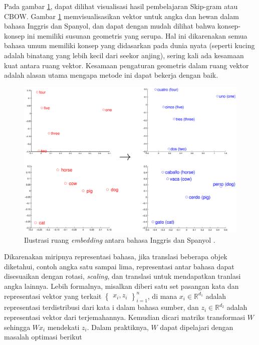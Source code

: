     Pada gambar \ref{fig:ilustrasi_embedding_inggris_spanyol}, dapat dilihat visualisasi hasil pembelajaran Skip-gram atau CBOW. Gambar \ref{fig:ilustrasi_embedding_inggris_spanyol} memvisualisasikan vektor untuk angka dan hewan dalam bahasa Inggris dan Spanyol, dan dapat dengan mudah dilihat bahwa konsep-konsep ini memiliki susunan geometris yang serupa. Hal ini dikarenakan semua bahasa umum memiliki konsep yang didasarkan pada dunia nyata (seperti kucing adalah binatang yang lebih kecil dari seekor anjing), sering kali ada kesamaan kuat antara ruang vektor. Kesamaan pengaturan geometris dalam ruang vektor adalah alasan utama mengapa metode ini dapat bekerja dengan baik.

    \begin{figure}[ht]
        \centering
        \includegraphics[width=1\textwidth]{resources/ilustration-eng-spn-word.png}
        \caption{Ilustrasi ruang \textit{embedding} antara bahasa Inggris dan Spanyol \parencite{MikolovExploiting}.}
        \label{fig:ilustrasi_embedding_inggris_spanyol}
    \end{figure}

    Dikarenakan miripnya representasi bahasa, jika translasi beberapa objek diketahui, contoh angka satu sampai lima, representasi antar bahasa dapat disesuaikan dengan rotasi, \textit{scaling}, dan translasi untuk mendapatkan tranlasi angka lainnya. Lebih formalnya, misalkan diberi satu set pasangan kata dan representasi vektor yang terkait \begin{math} \begin{Bmatrix} {x_{i}, z_{i}} \end{Bmatrix}_{i=1}^{n} \end{math}, di mana \(x_{i}\in\mathbb{R}^{d_{1}}\) adalah representasi terdistribusi dari kata i dalam bahasa sumber, dan \(z_{i}\in\mathbb{R}^{d_{2}}\) adalah representasi vektor dari terjemahannya. Kemudian dicari matriks transformasi \( W\) sehingga \(W x_{i}\) mendekati \(z_{i}\). Dalam praktiknya, \(W\) dapat dipelajari dengan masalah optimasi berikut

